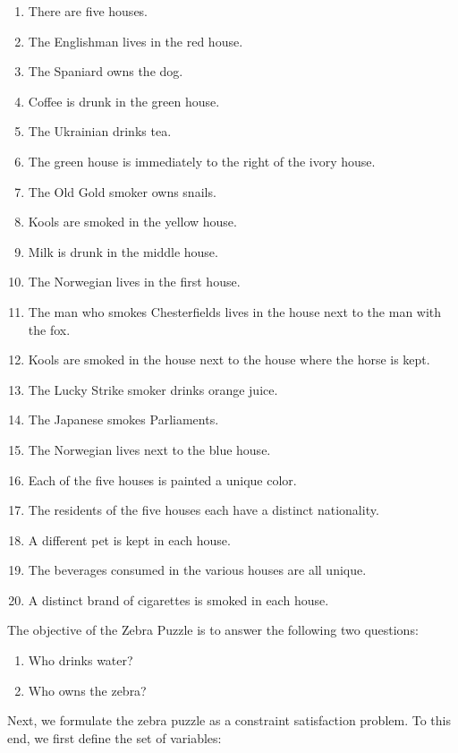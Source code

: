 \begin{enumerate}
    \item There are five houses.
    \item The Englishman lives in the red house.
    \item The Spaniard owns the dog.
    \item Coffee is drunk in the green house.
    \item The Ukrainian drinks tea.
    \item The green house is immediately to the right of the ivory house.
    \item The Old Gold smoker owns snails.
    \item Kools are smoked in the yellow house.
    \item Milk is drunk in the middle house.
    \item The Norwegian lives in the first house.
    \item The man who smokes Chesterfields lives in the house next to the man with the fox.
    \item Kools are smoked in the house next to the house where the horse is kept.
    \item The Lucky Strike smoker drinks orange juice.
    \item The Japanese smokes Parliaments.
    \item The Norwegian lives next to the blue house.
    \item Each of the five houses is painted a unique color.
    \item The residents of the five houses each have a distinct nationality.
    \item A different pet is kept in each house.
    \item The beverages consumed in the various houses are all unique.
    \item A distinct brand of cigarettes is smoked in each house.
\end{enumerate}

The objective of the Zebra Puzzle is to answer the following two questions:
\begin{enumerate}
    \item Who drinks water?
    \item Who owns the zebra?
\end{enumerate}

Next, we formulate the zebra puzzle as a constraint satisfaction problem.  To this end, we first
define the set of variables:

